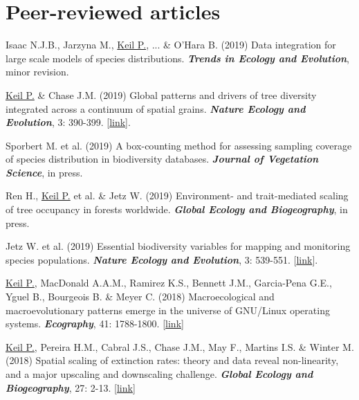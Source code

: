 \newpage

\HRule

\section{Peer-reviewed articles}

\begin{etaremune}

\item Isaac N.J.B., Jarzyna M., \underline{Keil P.}, ... \& O'Hara B. (2019) Data integration for large scale models of species distributions. \textit{\textbf{Trends in Ecology and Evolution}}, minor revision.

\item \underline{Keil P.} \& Chase J.M. (2019) Global patterns and drivers of tree diversity integrated across a continuum of spatial grains. \textit{\textbf{Nature Ecology and Evolution}}, 3: 390-399. [\href{https://www.nature.com/articles/s41559-019-0799-0}{link}].

\item Sporbert M. et al. (2019) A box-counting method for assessing sampling coverage of species distribution in biodiversity databases. \textit{\textbf{Journal of Vegetation Science}}, in press.

\item Ren H., \underline{Keil P.} et al. \& Jetz W. (2019) Environment- and trait-mediated scaling of tree occupancy in forests worldwide. \textit{\textbf{Global Ecology and Biogeography}}, in press.

\item Jetz W. et al. (2019) Essential biodiversity variables for mapping and monitoring species populations. \textit{\textbf{Nature Ecology and Evolution}}, 3: 539-551. [\href{https://www.nature.com/articles/s41559-019-0826-1}{link}].

\item \underline{Keil P.}, MacDonald A.A.M., Ramirez K.S., Bennett J.M., Garcia-Pena G.E., Yguel B., Bourgeois B. \& Meyer C. (2018)  Macroecological and macroevolutionary patterns emerge in the universe of GNU/Linux operating systems. \textit{\textbf{Ecography}}, 41: 1788-1800. [\href{https://onlinelibrary.wiley.com/doi/full/10.1111/ecog.03424}{link}]

\item \underline{Keil P.}, Pereira H.M., Cabral J.S., Chase J.M., May F., Martins I.S. \& Winter M. (2018) Spatial scaling of extinction rates: theory and data reveal non-linearity, and a major upscaling and downscaling challenge. \textit{\textbf{Global Ecology and Biogeography}}, 27: 2-13. [\href{http://onlinelibrary.wiley.com/doi/10.1111/geb.12669/abstract}{link}]


\end{etaremune}
